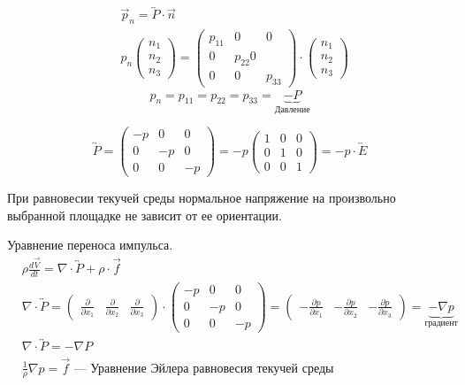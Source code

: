 \begin{note}
  \begin{align*}
    &\vec{p}_n = \overleftrightarrow{P} \cdot \vec{n} \\
    &p_n \begin{pmatrix}
        n_1 \\
        n_2 \\
        n_3
      \end{pmatrix} = \begin{pmatrix} p_{11} &0 &0 \\
        0 &p_{22} 0 \\
        0 &0 &p_{33}
    \end{pmatrix} \cdot
               \begin{pmatrix}
                 n_1 \\
                 n_2 \\
                 n_3
               \end{pmatrix}
  \end{align*}
\[
p_n = p_{11} = p_{22} = p_{33} = \underbrace{-P}_{Давление}
\]
\end{note}

\[
\overleftrightarrow{P} =
\begin{pmatrix}
  -p &0 &0\\
  0 &-p &0\\
  0 &0 &-p
\end{pmatrix} = -p
\begin{pmatrix}
  1 &0 &0 \\
  0 &1 &0 \\
  0 &0 &1
\end{pmatrix} = -p \cdot \overleftrightarrow{E}
\]

\begin{note}
  При равновесии текучей среды нормальное напряжение на произвольно выбранной
  площадке не зависит от ее ориентации.
\end{note}

Уравнение переноса импульса.
\begin{align*}
  & \rho \frac{d\vec{V}}{dt} = \nabla \cdot \overleftrightarrow{P} + \rho \cdot \vec{f} \\
  & \nabla \cdot \overleftrightarrow{P} = \begin{pmatrix}
      \frac{\partial}{\partial x_1} & \frac{\partial}{\partial x_2} & \frac{\partial}{\partial x_3}
    \end{pmatrix} \cdot \begin{pmatrix}
      -p &0 &0 \\
      0 &-p &0 \\
      0 &0 &-p
    \end{pmatrix} = \begin{pmatrix}
      -\frac{\partial p}{\partial x_1} & -\frac{\partial p}{\partial x_2} & -\frac{\partial p}{\partial x_3}
    \end{pmatrix} = \underbrace{-\nabla p}_{\text{градиент}}\\
  &\nabla \cdot \overleftrightarrow{P}= - \nabla P \\
  &\frac 1\rho \nabla p = \vec{f} \text{ --- Уравнение Эйлера равновесия текучей среды}
\end{align*}

